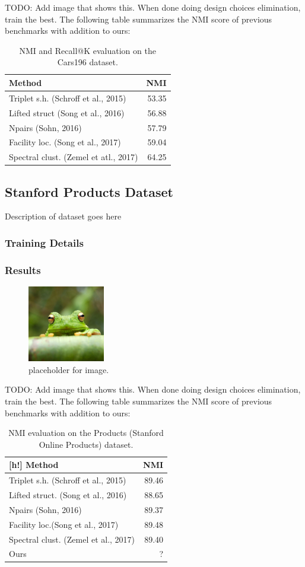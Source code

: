 TODO: Add image that shows this. When done doing design choices elimination, train the best.
The following table summarizes the NMI score of previous benchmarks with addition to ours:
\begin{table}[h!]
\centering
\begin{tabular}{l|r}
Method & NMI \\\hline
Triplet s.h. (Schroff et al., 2015) & 53.35 \\
Lifted struct (Song et al., 2016) & 56.88 \\
Npairs (Sohn, 2016) & 57.79 \\ 
Facility loc. (Song et al., 2017) & 59.04 \\
Spectral clust. (Zemel et atl., 2017) & 64.25 \\
\end{tabular}
\caption{\label{tab:score compare} NMI and Recall@K evaluation on the Cars196 dataset.}
\end{table}
\subsection{Stanford Products Dataset}
Description of dataset goes here
\subsubsection{Training Details}
\subsubsection{Results}
\begin{figure}[h!]
\centering
\includegraphics[width=0.3\textwidth]{imgs/frog.jpg}
\caption{\label{fig:frog}placeholder for image.}
\end{figure}
TODO: Add image that shows this. When done doing design choices elimination, train the best.
The following table summarizes the NMI score of previous benchmarks with addition to ours:
\begin{table}[h!]
\centering
\begin{tabular}{l|r}[h!]
Method & NMI \\\hline
Triplet s.h. (Schroff et al., 2015) & 89.46 \\
Lifted struct. (Song et al., 2016) & 88.65 \\
Npairs (Sohn, 2016) & 89.37 \\
Facility loc.(Song et al., 2017) & 89.48 \\
Spectral clust. (Zemel et al., 2017) &  89.40 \\
Ours & ?
\end{tabular}
\caption{\label{tab:score compare} NMI evaluation on the Products (Stanford
Online Products) dataset.}
\end{table}


